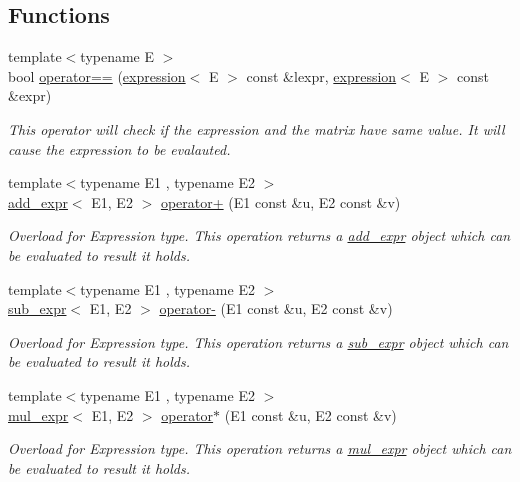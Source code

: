 \subsection*{Functions}
\begin{DoxyCompactItemize}
\item 
{\footnotesize template$<$typename E $>$ }\\bool \mbox{\hyperlink{namespacetest_a4789bcc417e51b81dfa45a4e173a435c}{operator==}} (\mbox{\hyperlink{classtest_1_1expression}{expression}}$<$ E $>$ const \&lexpr, \mbox{\hyperlink{classtest_1_1expression}{expression}}$<$ E $>$ const \&expr)
\begin{DoxyCompactList}\small\item\em This operator will check if the expression and the matrix have same value. It will cause the expression to be evalauted. \end{DoxyCompactList}\item 
{\footnotesize template$<$typename E1 , typename E2 $>$ }\\\mbox{\hyperlink{classtest_1_1add__expr}{add\+\_\+expr}}$<$ E1, E2 $>$ \mbox{\hyperlink{namespacetest_a2c910f0835e7bdf9b31af85264e4c3b2}{operator+}} (E1 const \&u, E2 const \&v)
\begin{DoxyCompactList}\small\item\em Overload for Expression type. This operation returns a \mbox{\hyperlink{classtest_1_1add__expr}{add\+\_\+expr}} object which can be evaluated to result it holds. \end{DoxyCompactList}\item 
{\footnotesize template$<$typename E1 , typename E2 $>$ }\\\mbox{\hyperlink{classtest_1_1sub__expr}{sub\+\_\+expr}}$<$ E1, E2 $>$ \mbox{\hyperlink{namespacetest_a949d3230afe0418cb028b829e9bf9a94}{operator-\/}} (E1 const \&u, E2 const \&v)
\begin{DoxyCompactList}\small\item\em Overload for Expression type. This operation returns a \mbox{\hyperlink{classtest_1_1sub__expr}{sub\+\_\+expr}} object which can be evaluated to result it holds. \end{DoxyCompactList}\item 
{\footnotesize template$<$typename E1 , typename E2 $>$ }\\\mbox{\hyperlink{classtest_1_1mul__expr}{mul\+\_\+expr}}$<$ E1, E2 $>$ \mbox{\hyperlink{namespacetest_a56ea9d576f5f2398586286d7f01fba47}{operator$\ast$}} (E1 const \&u, E2 const \&v)
\begin{DoxyCompactList}\small\item\em Overload for Expression type. This operation returns a \mbox{\hyperlink{classtest_1_1mul__expr}{mul\+\_\+expr}} object which can be evaluated to result it holds. \end{DoxyCompactList}\item 

\end{DoxyCompactItemize}
